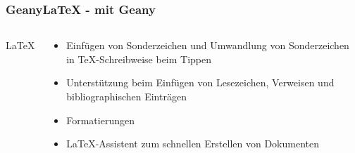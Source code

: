 
\begin{frame}
	\frametitle{GeanyLaTeX - \LaTeXe mit Geany}
	\begin{columns}[c]
		\column[c]{2cm}
			\huge \LaTeX
		\column{8cm}
			\begin{block}{}
				\begin{itemize}
					\item Einfügen von Sonderzeichen und Umwandlung von
						  Sonderzeichen in \TeX-Schreibweise beim Tippen
					\item Unterstützung beim Einfügen von Lesezeichen,
						  Verweisen und bibliographischen Einträgen
					\item Formatierungen
					\item \LaTeX-Assistent zum schnellen Erstellen von
						  Dokumenten
				\end{itemize}
			\end{block}
	\end{columns}
\end{frame}




